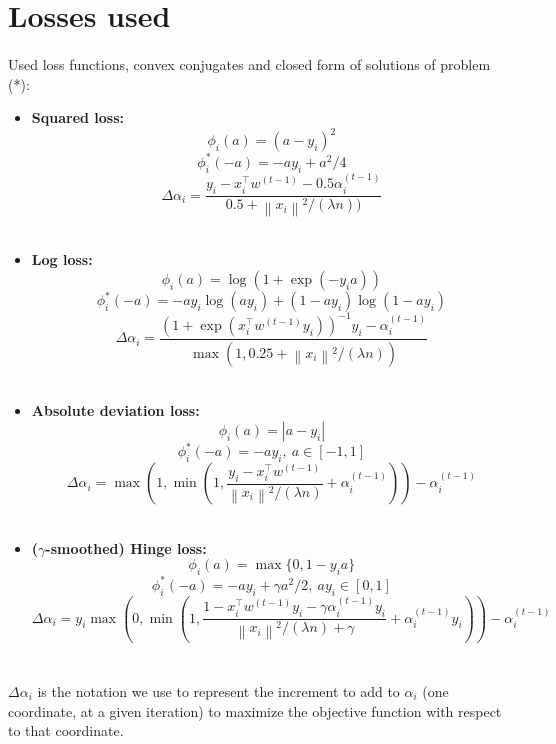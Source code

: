\documentclass{article}
\newcommand{\abs}[1]{\left|#1\right|}
\newcommand{\norm}[1]{\left\|#1 \right\|}
\begin{document}
\newpage
\appendix


\section{Losses used}
\label{appendix-losses}

\paragraph{}Used loss functions, convex conjugates and closed form of solutions of problem (*):

\begin{itemize}
    \item \textbf{Squared loss:}
			$$\phi_i(a) = (a-y_i)^2$$
			$$\phi_i^{*}(-a) = -ay_i+a^2/4$$
			$$\Delta \alpha_i = \dfrac{y_i-x_i^\top w^{(t-1)}-0.5\alpha_i^{(t-1)}}{0.5+\norm{x_i}^2/(\lambda n))}$$
			\\
	\item \textbf{Log loss:}
			$$\phi_i(a) = \log(1+\exp(-y_ia))$$
			$$\phi_i^{*}(-a) = -ay_i\log(ay_i) + (1-ay_i)\log(1-ay_i)$$
			$$\Delta \alpha_i = \dfrac{(1+\exp(x_i^\top w^{(t-1)}y_i))^{-1}y_i-\alpha_i^{(t-1)}}{\max(1,0.25+\norm{x_i}^2/(\lambda n))}$$
			\\
	\item 	\textbf{Absolute deviation loss:}
			$$\phi_i(a) = \abs{a-y_i}$$
			$$\phi_i^{*}(-a) = -ay_i, \ a \in [-1,1]$$
			$$\Delta \alpha_i = \max \left( 1, \min \left( 1, \dfrac{y_i-x_i^\top w^{(t-1)}}{\norm{x_i}^2/(\lambda n)} + \alpha_i^{(t-1)} \right) \right) - \alpha_i^{(t-1)}$$
			\\
	\item \textbf{($\gamma$-smoothed) Hinge loss:}
			$$\phi_i(a) = \max\{0,1-y_ia\}$$
			$$\phi_i^{*}(-a) = -ay_i + \gamma a^2/2, \ ay_i \in [0,1]$$
			$$\Delta \alpha_i = y_i \max \left( 0, \min \left( 1, \dfrac{1-x_i^\top w^{(t-1)} y_i-\gamma \alpha_i^{(t-1)}y_i}{\norm{x_i}^2/(\lambda n)+\gamma} + \alpha_i^{(t-1)} y_i \right) \right) - \alpha_i^{(t-1)}$$
			\\
\end{itemize}

\paragraph{}$\Delta \alpha_i$ is the notation we use to represent the increment to add to $\alpha_i$ (one coordinate, at a given iteration) to maximize the objective function with respect to that coordinate.
\end{document}
